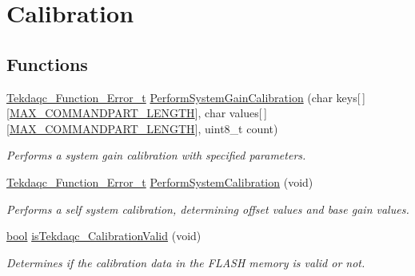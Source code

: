 \hypertarget{group__tekdaqc__calibration}{\section{Calibration}
\label{group__tekdaqc__calibration}
}
\subsection*{Functions}
\begin{DoxyCompactItemize}
\item 
\hyperlink{group__tekdaqc__error_ga19df05d919ecca7a7501b35ae9080a32}{Tekdaqc\-\_\-\-Function\-\_\-\-Error\-\_\-t} \hyperlink{group__tekdaqc__calibration_ga65885f14ff00d87bd3ca21265e7d26f6}{Perform\-System\-Gain\-Calibration} (char keys\mbox{[}$\,$\mbox{]}\mbox{[}\hyperlink{group__command__parser_ga6147771b5547853f33eb838895e3d5a2}{M\-A\-X\-\_\-\-C\-O\-M\-M\-A\-N\-D\-P\-A\-R\-T\-\_\-\-L\-E\-N\-G\-T\-H}\mbox{]}, char values\mbox{[}$\,$\mbox{]}\mbox{[}\hyperlink{group__command__parser_ga6147771b5547853f33eb838895e3d5a2}{M\-A\-X\-\_\-\-C\-O\-M\-M\-A\-N\-D\-P\-A\-R\-T\-\_\-\-L\-E\-N\-G\-T\-H}\mbox{]}, uint8\-\_\-t count)
\begin{DoxyCompactList}\small\item\em Performs a system gain calibration with specified parameters. \end{DoxyCompactList}\item 
\hyperlink{group__tekdaqc__error_ga19df05d919ecca7a7501b35ae9080a32}{Tekdaqc\-\_\-\-Function\-\_\-\-Error\-\_\-t} \hyperlink{group__tekdaqc__calibration_ga8aa6dd97a6551e9ca12b12439eec2332}{Perform\-System\-Calibration} (void)
\begin{DoxyCompactList}\small\item\em Performs a self system calibration, determining offset values and base gain values. \end{DoxyCompactList}\item 
\hyperlink{group__data__types_ga0ecf26b576b9a54eca656b9be7ba6a06}{bool} \hyperlink{group__tekdaqc__calibration_gae09f531b1b83f3e80e981f14bfc27261}{is\-Tekdaqc\-\_\-\-Calibration\-Valid} (void)
\begin{DoxyCompactList}\small\item\em Determines if the calibration data in the F\-L\-A\-S\-H memory is valid or not. \end{DoxyCompactList}\end{DoxyCompactItemize}


